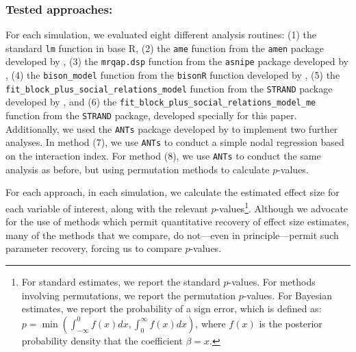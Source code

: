 \documentclass[Afour,sageh,times]{sagej}
\begin{document}
\subsubsection{Tested approaches:}
For each simulation, we evaluated eight different analysis routines: (1) the standard \texttt{lm} function in base R,  (2) the \texttt{ame} function from the \texttt{amen} package developed by \citet{hoff2021}, (3) the \texttt{mrqap.dsp} function from the \texttt{asnipe} package developed by \citet{farine2015constructing}, (4) the \texttt{bison\_model} function from the \texttt{bisonR} function developed by \citet{hart2023bison}, (5) the \texttt{fit\_block\_plus\_social\_relations\_model} function from the \texttt{STRAND} package developed by \citet{ross2022modelling}, and (6) the  \texttt{fit\_block\_plus\_social\_relations\_model\_me}  function from the \texttt{STRAND} package, developed specially for this paper. Additionally, we used the \texttt{ANTs} package developed by \citet{sosa2020multilevel} to implement two further analyses. In method (7), we use \texttt{ANTs} to conduct a simple nodal regression based on the interaction index. For method (8), we use \texttt{ANTs} to conduct the same analysis as before, but using permutation methods to calculate $p$-values.   %

For each approach, in each simulation, we calculate the estimated effect size for each variable of interest, along with the relevant $p$-values\footnote{For standard estimates, we report the standard $p$-values. For methods involving permutations, we report the permutation $p$-values. For Bayesian estimates, we report the probability of a sign error, which is defined as: $p = \min\left(\int_{-\infty}^{0}f(x) dx, \int_{0}^{\infty} f(x) dx\right)$, where $f(x)$ is the posterior probability density that the coefficient $\beta=x$. }. Although we advocate for the use of methods which permit quantitative recovery of effect size estimates, many of the methods that we compare, do not---even in principle---permit such parameter recovery, forcing us to compare $p$-values.
\end{document}

